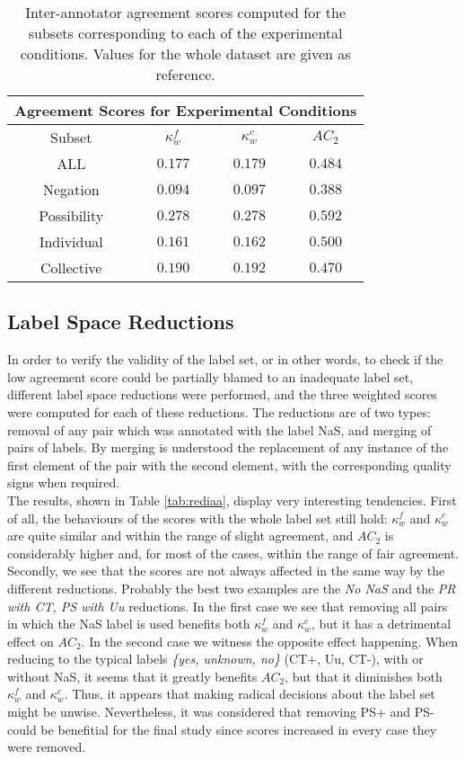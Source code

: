 \begin{table}
\centering
\begin{tabular}{|c|c|c|c|}
\hline
\multicolumn{4}{|c|}{Agreement Scores for Experimental Conditions}\\\hline
Subset &  $\kappa^{f}_{w}$ & $\kappa^{c}_{w}$ & $AC_2$\\\hline
ALL & $0.177$ & $0.179$ & $0.484$\\\hline
Negation & $0.094$ & $0.097$ & $0.388$\\\hline
Possibility & $0.278$ & $0.278$ & $0.592$\\\hline
Individual & $0.161$ & $0.162$ & $0.500$\\\hline
Collective & $0.190$ & $0.192$ & $0.470$\\\hline
\end{tabular}
\caption[Inter-annotator agreement scores for experimental conditions.]{Inter-annotator agreement scores computed for the subsets corresponding to each of the experimental conditions. Values for the whole dataset are given as reference.}
\label{tab:pilexpiaa}
\end{table}

\subsection{Label Space Reductions}
In order to verify the validity of the label set, or in other words, to check if the low agreement score could be partially blamed to an inadequate label set, different label space reductions were performed, and the three weighted scores were computed for each of these reductions. The reductions are of two types: removal of any pair which was annotated with the label NaS, and merging of pairs of labels. By merging is understood the replacement of any instance of the first element of the pair with the second element, with the corresponding quality signs when required.\\

The results, shown in Table \ref{tab:rediaa}, display very interesting tendencies. First of all, the behaviours of the scores with the whole label set still hold: $\kappa^{f}_{w}$ and $\kappa^{c}_{w}$ are quite similar and within the range of slight agreement, and $AC_2$ is considerably higher and, for most of the cases, within the range of fair agreement. Secondly, we see that the scores are not always affected in the same way by the different reductions. Probably the best two examples are the \textit{No NaS} and the \textit{PR with CT, PS with Uu} reductions. In the first case we see that removing all pairs in which the NaS label is used benefits both $\kappa^{f}_{w}$ and $\kappa^{c}_{w}$, but it has a detrimental effect on $AC_2$. In the second case we witness the opposite effect happening. When reducing to the typical labels \textit{\{yes, unknown, no\}} (CT+, Uu, CT-), with or without NaS, it seems that it greatly benefits $AC_2$, but that it diminishes both $\kappa^{f}_{w}$ and $\kappa^{c}_{w}$. Thus, it appears that making radical decisions about the label set might be unwise. Nevertheless, it was considered that removing PS+ and PS- could be benefitial for the final study since scores increased in every case they were removed.\\

